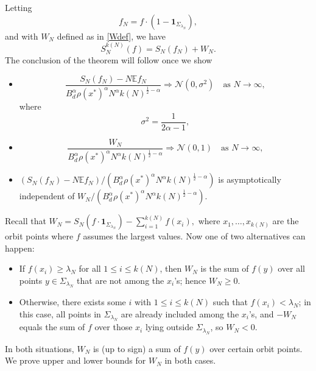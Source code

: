 \documentclass[11pt,twoside,a4paper,reqno]{amsart}
\newcommand{\as}[1]{\text{as } #1 \rightarrow\infty}
\newcommand{\E}{\mathbb{E}}
\def\one{{\mathbf{1}}}
\begin{document}
Letting
\begin{equation*}
f_N=f \cdot \left(1-\one_{\Sigma_{\lambda_N}} \right),
\end{equation*}
and with $W_N$ defined as in \eqref{Wdef}, we have
\begin{equation*}
S_N^{k(N)}(f) = S_N(f_N)+W_N.
\end{equation*}
The conclusion of the theorem will follow once we show
\begin{itemize}
\item[(A)] \begin{equation*}
\frac{S_N(f_N)-N \E f_N}{B_d^{\alpha} \rho(x^*)^{\alpha} N^{\alpha} k(N)^{\frac{1}{2}-\alpha}} \Rightarrow \mathcal{N}(0,\sigma^2) \quad \as{N},
\end{equation*}
where
\begin{equation*}
\sigma^2 = \frac{1}{2\alpha - 1},
\end{equation*}
\item[(B)] \begin{equation*}
\frac{W_N}{B_d^{\alpha} \rho(x^*)^{\alpha} N^{\alpha} k(N)^{\frac{1}{2}-\alpha}} \Rightarrow \mathcal{N}(0,1) \quad \as{N},
\end{equation*}
\item[(C)] $(S_N(f_N)-N\E f_N) / (B_d^{\alpha} \rho(x^*)^{\alpha} N^{\alpha} k(N)^{\frac{1}{2}-\alpha})$ is asymptotically independent of $W_N /(B_d^{\alpha} \rho(x^*)^{\alpha} N^{\alpha} k(N)^{\frac{1}{2}-\alpha})$.
\end{itemize}

Recall that $W_N = S_N\left(f \cdot \one_{\Sigma_{\lambda_N}}\right) - \sum_{i=1}^{k(N)} f(x_i),$
where $x_1,\dots,x_{k(N)}$ are the orbit points where $f$ assumes the largest values. Now one of two alternatives can happen:
\begin{itemize}
\item[(i)] If $f(x_i) \geq \lambda_N$ for all $1 \leq i \leq k(N)$, then $W_N$ is the sum of $f(y)$ over all points $y \in \Sigma_{\lambda_N}$ that are not among the $x_i$'s; hence $W_N \geq 0$.
\item[(ii)] Otherwise, there exists some $i$ with $1 \leq i \leq k(N)$ such that $f(x_i) < \lambda_N$; in this case, all points in $\Sigma_{\lambda_N}$ are already included among the $x_i$'s, and $-W_N$ equals the sum of $f$ over those $x_i$ lying outside $\Sigma_{\lambda_N}$, so $W_N< 0$.
\end{itemize}

In both situations, $W_N$ is (up to sign) a sum of $f(y)$ over certain orbit points. We prove upper and lower bounds for $W_N$ in both cases.
\end{document}
